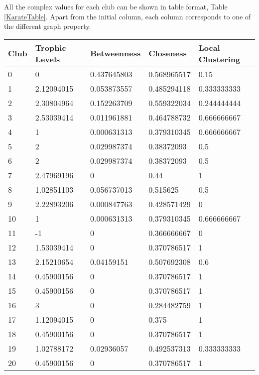 All the complex values for each club can be shown in table format, Table \ref{KarateTable}. Apart from the initial column, each column corresponds to one of the different graph property.

\begin{table}[!htb]
    \centering
    \small
    \begin{tabular}{|l|l|l|l|l|}
        \hline
        \textbf{Club} & \textbf{Trophic Levels} & \textbf{Betweenness} & \textbf{Closeness} & \textbf{Local Clustering} \\ \hline
        0 & 0 & 0.437645803 & 0.568965517 & 0.15 \\ \hline
        1 & 2.12094015 & 0.053873557 & 0.485294118 & 0.333333333 \\ \hline
        2 & 2.30804964 & 0.152263709 & 0.559322034 & 0.244444444 \\ \hline
        3 & 2.53039414 & 0.011961881 & 0.464788732 & 0.666666667 \\ \hline
        4 & 1 & 0.000631313 & 0.379310345 & 0.666666667 \\ \hline
        5 & 2 & 0.029987374 & 0.38372093 & 0.5 \\ \hline
        6 & 2 & 0.029987374 & 0.38372093 & 0.5 \\ \hline
        7 & 2.47969196 & 0 & 0.44 & 1 \\ \hline
        8 & 1.02851103 & 0.056737013 & 0.515625 & 0.5 \\ \hline
        9 & 2.22893206 & 0.000847763 & 0.428571429 & 0 \\ \hline
        10 & 1 & 0.000631313 & 0.379310345 & 0.666666667 \\ \hline
        11 & -1 & 0 & 0.366666667 & 0 \\ \hline
        12 & 1.53039414 & 0 & 0.370786517 & 1 \\ \hline
        13 & 2.15210654 & 0.04159151 & 0.507692308 & 0.6 \\ \hline
        14 & 0.45900156 & 0 & 0.370786517 & 1 \\ \hline
        15 & 0.45900156 & 0 & 0.370786517 & 1 \\ \hline
        16 & 3 & 0 & 0.284482759 & 1 \\ \hline
        17 & 1.12094015 & 0 & 0.375 & 1 \\ \hline
        18 & 0.45900156 & 0 & 0.370786517 & 1 \\ \hline
        19 & 1.02788172 & 0.02936057 & 0.492537313 & 0.333333333 \\ \hline
        20 & 0.45900156 & 0 & 0.370786517 & 1 \\ \hline

\end{tabular}
\end{table}
